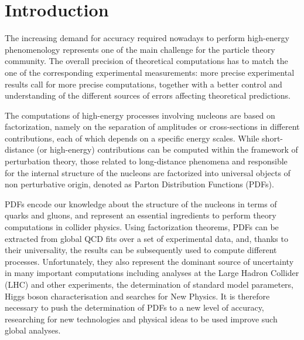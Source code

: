 \chapter*{Introduction}
The increasing demand for accuracy required nowadays to perform high-energy phenomenology
represents one of the main challenge for the particle theory community. The
overall precision of theoretical computations has to match the one of the corresponding
experimental measurements: more precise  
experimental results call for more precise computations, together with a better control
and understanding of the different sources of errors affecting theoretical predictions. 

The computations of high-energy processes involving nucleons are based on factorization, namely on the separation
of amplitudes or cross-sections in different contributions, each of which depends on a specific energy scales.
While short-distance (or high-energy) contributions can be computed within the framework of perturbation theory,
those related to long-distance phenomena and responsible for the internal
structure of the nucleons are factorized into universal objects of non perturbative origin,
denoted as Parton Distribution Functions (PDFs).
 

PDFs encode our knowledge about the structure of the nucleons in terms of quarks and
gluons, and represent an essential ingredients to perform theory computations in collider physics.
Using factorization theorems, PDFs can be extracted from global QCD fits
over a set of experimental data, and, thanks to their universality, the results can be subsequently used
to compute different processes. 
Unfortunately, they also represent the dominant source of uncertainty in many important computations
including analyses at the Large Hadron Collider (LHC) and other experiments,
the determination of standard model parameters, Higgs boson characterisation and searches for New Physics.
It is therefore necessary to push the determination of PDFs to a new level of accuracy,
researching for new technologies and physical ideas to be used improve such global analyses.

